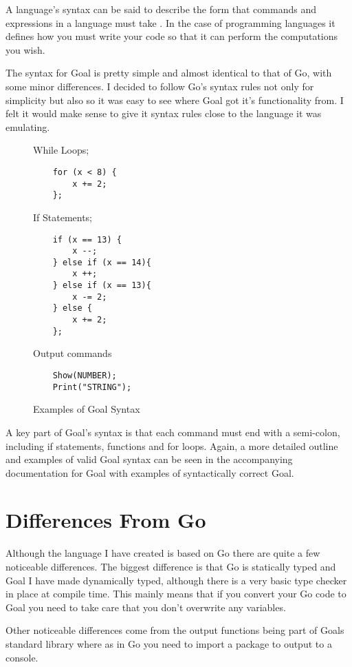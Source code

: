 A language's syntax can be said to describe the form that commands and expressions in a language must take \cite[p.~72]{CompGen1997}. In the case of programming languages it defines how you must write your code so that it can perform the computations you wish.

The syntax for Goal is pretty simple and almost identical to that of Go, with some minor differences. I decided to follow Go's syntax rules not only for simplicity but also so it was easy to see where Goal got it's functionality from. I felt it would make sense to give it syntax rules close to the language it was emulating.

\begin{figure}[h]
\centering
While Loops;
\begin{lstlisting}
	for (x < 8) {
		x += 2;
	};
\end{lstlisting}

If Statements;
\begin{lstlisting}
	if (x == 13) {
		x --;
	} else if (x == 14){
		x ++;
	} else if (x == 13){
		x -= 2;
	} else {
		x += 2;
	};
\end{lstlisting}

Output commands
\begin{lstlisting}
	Show(NUMBER);
	Print("STRING");
\end{lstlisting}

\caption{Examples of Goal Syntax}
\label{fig:egGoalSyntax} 
\end{figure}
 
A key part of Goal's syntax is that each command must end with a semi-colon, including if statements, functions and for loops. Again, a more detailed outline and examples of valid Goal syntax can be seen in the accompanying documentation for Goal with examples of syntactically correct Goal. 


\section{Differences From Go}

Although the language I have created is based on Go there are quite a few noticeable differences. The biggest difference is that Go is statically typed and Goal I have made dynamically typed, although there is a very basic type checker in place at compile time. This mainly means that if you convert your Go code to Goal you need to take care that you don't overwrite any variables.

Other noticeable differences come from the output functions being part of Goals standard library where as in Go you need to import a package to output to a console.

